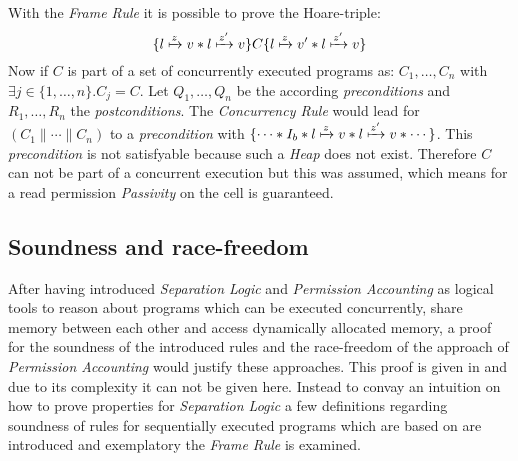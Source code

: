 \begin{myproof}
		With the \emph{Frame Rule} it is possible to prove the  Hoare-triple:
		$$\{l\xmapsto{z}v\ast l\xmapsto{z'}v\}C\{l\xmapsto{z}v'\ast l\xmapsto{z'}v\}$$
		Now if $C$ is part of a set of concurrently executed programs as:
		$C_1,\dots,C_n$ with $\exists j\in \{1,\dots,n\}.C_j = C$. Let $Q_1,\dots,Q_n$
		be the according \emph{preconditions} and $R_1,\dots,R_n$ the \emph{postconditions}.
		The \emph{Concurrency Rule} would lead for $(C_1\parallel\cdots\parallel C_n)$
		to a \emph{precondition} with
		$\{\cdots\ast I_b \ast l\xmapsto{z}v \ast l\xmapsto{z'}v \ast\cdots\}$. This
		\emph{precondition} is not satisfyable because such a \emph{Heap} does not
		exist. Therefore $C$ can not be part of a concurrent execution but this
		was assumed, which means for a read permission \emph{Passivity} on the cell
		is guaranteed.
	\end{myproof}

	\subsection{Soundness and race-freedom}
	\label{sec:soundness}
	After having introduced \emph{Separation Logic} and
	\emph{Permission Accounting} as logical tools to reason about programs which
	can be executed concurrently, share memory between each other and access
	dynamically allocated memory, a proof for the soundness of the introduced
	rules and the race-freedom of the approach of \emph{Permission Accounting}
	would justify these approaches. This proof is given in \cite{seplogproof}
	and due to its complexity it can not be given here.
	Instead to convay an intuition on how to prove properties for
	\emph{Separation Logic} a few definitions regarding soundness of rules for
	sequentially executed programs which are based on \cite{sembasis} are
	introduced and exemplatory the \emph{Frame Rule} is examined.

